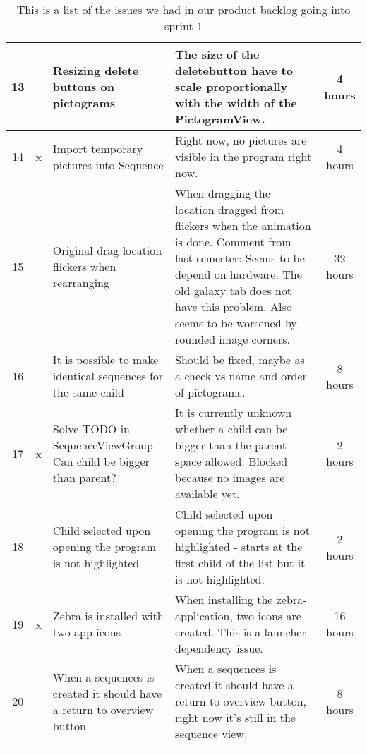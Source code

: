 \begin{longtable} { | c | c | p{5cm} | p{5cm} | c | }
	13	& 		&	Resizing delete buttons on pictograms	&	The size of the deletebutton have to scale proportionally with the width of the PictogramView.	&	4 hours	\\\hline
	14	& 	x	&	Import temporary pictures into Sequence	&	Right now, no pictures are visible in the program right now.	&	4 hours	\\\hline
	15	& 		&	Original drag location flickers when rearranging	&	When dragging the location dragged from flickers when the animation is done. Comment from last semester: Seems to be depend on hardware. The old galaxy tab does not have this problem. Also seems to be worsened by rounded image corners.	&	32 hours 	\\\hline
	16	& 		&	It is possible to make identical sequences for the same child	&	Should be fixed, maybe as a check vs name and order of pictograms.	&	8 hours	\\\hline
	17	& 	x	&	Solve TODO in SequenceViewGroup - Can child be bigger than parent?	&	It is currently unknown whether a child can be bigger than the parent space allowed. Blocked because no images are available yet.	&	2 hours	\\\hline
	18	& 		&	Child selected upon opening the program is not highlighted	&	Child selected upon opening the program is not highlighted - starts at the first child of the list but it is not highlighted.	&	2 hours	\\\hline
	19	& 	x	&	Zebra is installed with two app-icons	&	When installing the zebra-application, two icons are created. This is a launcher dependency issue.	&	16 hours\\\hline
	20	& 		&	When a sequences is created it should have a return to overview button	&	When a sequences is created it should have a return to overview button, right now it's still in the sequence view.	&	8 hours\\\hline
\caption{This is a list of the issues we had in our product backlog going into sprint 1}
\label{tab:spr1_prodblog}
\end{longtable}


